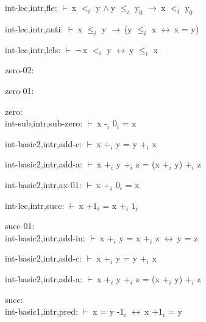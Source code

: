 \documentclass[a4paper]{article}
\newcommand{\Fol}{\mbox{$\vdash\ $}}
\newcommand{\Not}{\mbox{$\neg\ $}}
\newcommand{\And}{\mbox{$\wedge\ $}}
\newcommand{\Imp}{\mbox{$\rightarrow\ $}}
\newcommand{\Equiv}{\mbox{$\leftrightarrow\ $}}
\begin{document}
int-lec,intr,fle: 
 \Fol x $\mbox{$<$}_{i}$ y \And y $\mbox{$\le$}_{i}$ $\mbox{y}_{0}$ \Imp x $\mbox{$<$}_{i}$ $\mbox{y}_{0}$



int-lec,intr,anti: 
 \Fol x $\mbox{$\le$}_{i}$ y \Imp (y $\mbox{$\le$}_{i}$ x \Equiv x = y)



int-lec,intr,lels: 
 \Fol \Not x $\mbox{$<$}_{i}$ y \Equiv y $\mbox{$\le$}_{i}$ x



\bigskip

zero-02:\\ 

\bigskip

zero-01:\\ 

\bigskip

zero:\\ int-sub,intr,sub-zero: 
 \Fol x $\mbox{-}_{i}$ $\mbox{0}_{i}$ = x



int-basic2,intr,add-c: 
 \Fol x $\mbox{+}_{i}$ y = y $\mbox{+}_{i}$ x



int-basic2,intr,add-a: 
 \Fol x $\mbox{+}_{i}$ y $\mbox{+}_{i}$ z = (x $\mbox{+}_{i}$ y) $\mbox{+}_{i}$ z



int-basic2,intr,ax-01: 
 \Fol x $\mbox{+}_{i}$ $\mbox{0}_{i}$ = x



int-lec,intr,succ: 
 \Fol x $\mbox{+1}_{i}$ = x $\mbox{+}_{i}$ $\mbox{1}_{i}$



\bigskip

succ-01:\\ int-basic2,intr,add-in: 
 \Fol x $\mbox{+}_{i}$ y = x $\mbox{+}_{i}$ z \Equiv y = z



int-basic2,intr,add-c: 
 \Fol x $\mbox{+}_{i}$ y = y $\mbox{+}_{i}$ x



int-basic2,intr,add-a: 
 \Fol x $\mbox{+}_{i}$ y $\mbox{+}_{i}$ z = (x $\mbox{+}_{i}$ y) $\mbox{+}_{i}$ z



\bigskip

succ:\\ int-basic1,intr,pred: 
 \Fol x = y $\mbox{-1}_{i}$ \Equiv x $\mbox{+1}_{i}$ = y
\end{document}
